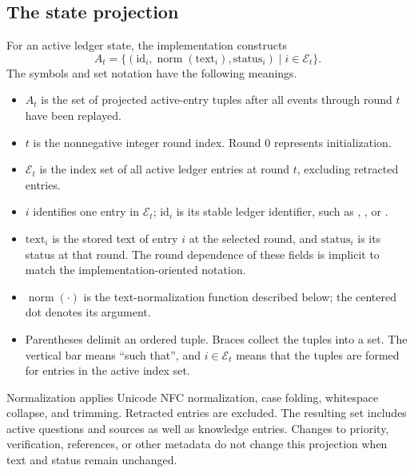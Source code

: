 \documentclass[12pt,a4paper]{article}
\newcommand{\code}[1]{\texttt{\detokenize{#1}}}
\begin{document}
\subsection{The state projection}
For an active ledger state, the implementation constructs
\begin{equation}
 A_t=\{(\mathrm{id}_i,\operatorname{norm}(\mathrm{text}_i),\mathrm{status}_i)\mid i\in\mathcal{E}_t\}.
\end{equation}
The symbols and set notation have the following meanings.
\begin{itemize}
\item $A_t$ is the set of projected active-entry tuples after all events through round $t$ have been replayed.
\item $t$ is the nonnegative integer round index. Round $0$ represents initialization.
\item $\mathcal{E}_t$ is the index set of all active ledger entries at round $t$, excluding retracted entries.
\item $i$ identifies one entry in $\mathcal{E}_t$; $\mathrm{id}_i$ is its stable ledger identifier, such as \code{K1}, \code{Q1}, or \code{S1}.
\item $\mathrm{text}_i$ is the stored text of entry $i$ at the selected round, and $\mathrm{status}_i$ is its status at that round. The round dependence of these fields is implicit to match the implementation-oriented notation.
\item $\operatorname{norm}(\cdot)$ is the text-normalization function described below; the centered dot denotes its argument.
\item Parentheses delimit an ordered tuple. Braces collect the tuples into a set. The vertical bar means ``such that'', and $i\in\mathcal{E}_t$ means that the tuples are formed for entries in the active index set.
\end{itemize}
Normalization applies Unicode NFC normalization, case folding, whitespace collapse, and trimming. Retracted entries are excluded. The resulting set includes active questions and sources as well as knowledge entries. Changes to priority, verification, references, or other metadata do not change this projection when text and status remain unchanged.
\end{document}
